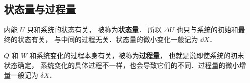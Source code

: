 \subsection{状态量与过程量}
内能 $U$ 只和系统的状态有关， 被称为\textbf{状态量}． 所以 $\Delta U$ 也只与系统的初始和最终的状态有关， 与中间的过程无关．状态量的微小变化一般记为 $\dd X$．

$Q$ 和 $W$ 和系统变化的过程本身有关，被称为\textbf{过程量}， 也就是说即使系统的初末状态确定， 系统变化的具体过程不一样，也会导致它们的不同．过程量的微小增量一般记为 $\delta X$．


